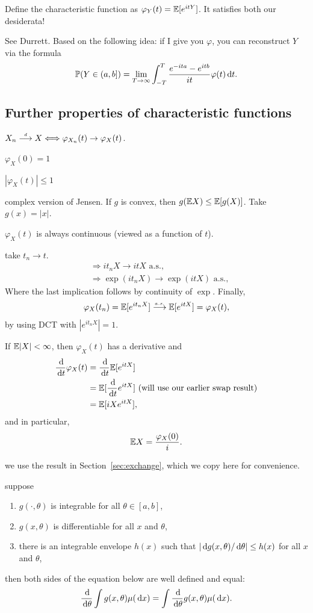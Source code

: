 \documentclass{article}
\begin{document}
 Define the characteristic function as $\varphi_Y(t) = {\mathbb E}[e^{itY}]$. It satisfies both our desiderata!

 See Durrett. Based on the following idea: if I give you $\varphi$, you can reconstruct $Y$ via the formula
\[ {\mathbb P}(Y \in (a, b]) = \lim_{T\to\infty} \int_{-T}^T \frac{e^{-ita} - e^{itb}}{it} \varphi(t) \,\mathrm{d} t. \]


\subsection{Further properties of characteristic functions}

 $X_n \stackrel{\scriptscriptstyle d}{\longrightarrow} X \Longleftrightarrow \varphi_{X_n}(t) \to \varphi_{X}(t)$.

 $\varphi_X(0) = 1$

 $|\varphi_X(t)| \le 1$

 complex version of Jensen. If $g$ is convex, then $g({\mathbb E} X) \le {\mathbb E}[g(X)]$. Take $g(x) = |x|$.

 $\varphi_X(t)$ is always continuous (viewed as a function of $t$). 

 take $t_n \to t$.
\begin{align*}
&\Longrightarrow i t_n X \to i t X \text{ a.s.}, \\
&\Longrightarrow \exp(i t_n X) \to \exp(i t X) \text{ a.s.}, 
\end{align*}
Where the last implication follows by continuity of $\exp$. Finally,
\[ \varphi_X(t_n) = {\mathbb E}[e^{it_n X}] \stackrel{\scriptscriptstyle a.s.}{\longrightarrow} {\mathbb E}[e^{itX}] = \varphi_X(t), \]
by using DCT with $|e^{it_n X}| = 1$.

 If ${\mathbb E}|X| < \infty$, then $\varphi_X(t)$ has a derivative and 
\begin{align*} 
\frac{\,\mathrm{d}}{\,\mathrm{d} t} \varphi_X(t) &= \frac{\,\mathrm{d}}{\,\mathrm{d} t} {\mathbb E}[ e^{itX} ] \\
&= {\mathbb E}[\frac{\,\mathrm{d}}{\,\mathrm{d} t} e^{itX}] \text{ (will use our earlier swap result)} \\
&= {\mathbb E}[iX e^{itX}], 
\end{align*}
and in particular,
\[ {\mathbb E} X = \frac{\varphi_X(0)}{i}. \]

 we use the result in Section~\ref{sec:exchange}, which we copy here for convenience.

 suppose 
\begin{enumerate}
	\item $g(\cdot, \theta)$ is integrable for all $\theta \in [a, b]$, 
	\item $g(x, \theta)$ is differentiable for all $x$ and $\theta$, 
	\item there is an integrable envelope $h(x)$ such that $|\,\mathrm{d} g(x, \theta) / \,\mathrm{d} \theta| \le h(x)$ for all $x$ and $\theta$,
\end{enumerate}
then both sides of the equation below are well defined and equal:
\[ \frac{\,\mathrm{d}}{\,\mathrm{d} \theta} \int g(x, \theta) \mu(\,\mathrm{d} x) = \int \frac{\,\mathrm{d}}{\,\mathrm{d} \theta} g(x, \theta)   \mu(\,\mathrm{d} x). \]
\end{document}
